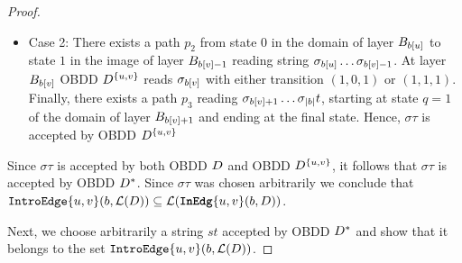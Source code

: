 \begin{proof}
\begin{itemize}
        \item Case 2: There exists a path $p_2$ from state $0$ in the domain of layer $B_{b[u]}$ to state $1$ in the image of layer $B_{b[v]-1}$ reading string $\sigma_{b[u]}\dots \sigma_{b[v]-1}$. At layer $B_{b[v]}$ OBDD $D^{\{u,v\}}$ reads $\sigma_{b[v]}$ with either transition $(1,0,1)$ or $(1,1,1)$. Finally, there exists a path $p_3$ reading  $\sigma_{b[v] + 1}\dots \sigma_{|b|}t$, starting at state $q=1$ of the domain of layer $B_{b[v] + 1}$ and ending at the final state. Hence, $\sigma\tau$ is accepted by OBDD $D^{\{u,v\}}$
    \end{itemize}

    Since $\sigma\tau$ is accepted by both OBDD $D$ and OBDD $D^{\{u,v\}}$, it follows that $\sigma\tau$ is accepted by OBDD $D^*$. Since $\sigma\tau$ was chosen arbitrarily we conclude that $\texttt{IntroEdge}\{u,v\}(b,\mathcal{L}(D)) \subseteq \mathcal{L}(\texttt{\textbf{InEdg}}\{u,v\}(b,D))$.

    Next, we choose arbitrarily a string $st$ accepted by OBDD $D^*$ and show that it belongs to the set $\texttt{IntroEdge}\{u,v\}(b,\mathcal{L}(D))$.


\end{proof}
